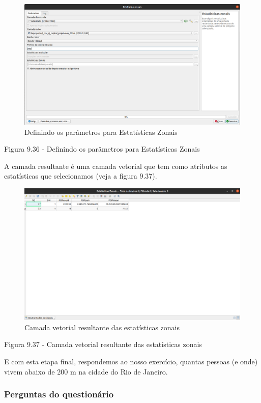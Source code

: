 \documentclass[
  portuguese,
]{krantz}
\begin{document}
\begin{figure}
\centering
\includegraphics{media/modulo9/fig936.png}
\caption{Definindo os parâmetros para Estatísticas Zonais}
\end{figure}

Figura 9.36 - Definindo os parâmetros para Estatísticas Zonais

A camada resultante é uma camada vetorial que tem como atributos as estatísticas que selecionamos (veja a figura 9.37).

\begin{figure}
\centering
\includegraphics{media/modulo9/fig937.png}
\caption{Camada vetorial resultante das estatísticas zonais}
\end{figure}

Figura 9.37 - Camada vetorial resultante das estatísticas zonais

E com esta etapa final, respondemos ao nosso exercício, quantas pessoas (e onde) vivem abaixo de 200 m na cidade do Rio de Janeiro.

\hypertarget{perguntas-do-questionuxe1rio-16}{%
\subsubsection{\texorpdfstring{\textbf{Perguntas do questionário}}{Perguntas do questionário}}\label{perguntas-do-questionuxe1rio-16}}
\end{document}
